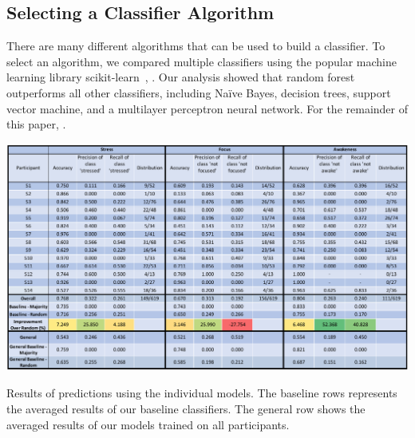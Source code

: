 \subsection{Selecting a Classifier Algorithm}

There are many different algorithms that can be used to build a classifier. To select an
algorithm, we compared multiple classifiers using the popular machine learning library scikit-learn~\cite{pedregosa11},  . Our analysis showed that random forest outperforms all other classifiers, including Na\"ive Bayes, decision trees, support vector machine, and a multilayer perceptron neural network. For the remainder of this paper, .%



\begin{table}[h]
  \centering
  \includegraphics[width=1.0\textwidth]{rq1performance_v2.pdf}
  \caption{Results of predictions using the individual models.  The baseline rows represents the averaged results of our baseline classifiers. The general row shows the averaged results of our models trained on all participants.}\label{tab:accuracy}%
  \vspace*{-4mm}
\end{table}


